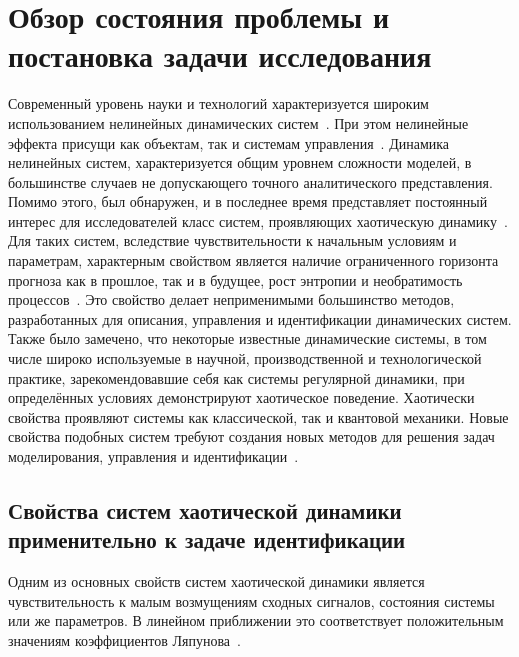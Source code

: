 \chapter{Обзор состояния проблемы и постановка задачи исследования}

Современный уровень науки и технологий характеризуется
широким использованием нелинейных динамических
систем~\cite{andronov_vitt_haikin,anisch_nonlin_eff,mishenko_du_small_relax,nonlin_vibro,malinetskii_modern_methods_nl_dyn}.
При этом нелинейные эффекта присущи как объектам,
так и системам управления~\cite{kubik_nlsc,vukobr_nonadopt}. Динамика нелинейных систем,
характеризуется общим уровнем сложности моделей,
в большинстве случаев не допускающего
точного аналитического представления.
Помимо этого, был обнаружен, и в последнее время представляет
постоянный интерес для исследователей класс систем,
проявляющих хаотическую динамику~\cite{moon_chaotic_vibr,magni_theory_dyn_chaos,kuznetsov_dyn_chaos,neimark_stoch_chaos_vibro,anisch_reg_and_chaotic_vibro}.
Для таких систем, вследствие чувствительности к начальным условиям
и параметрам, характерным свойством является наличие ограниченного горизонта прогноза как
в прошлое, так и в будущее, рост энтропии
и необратимость процессов~\cite{chernavskii_syn_info,prigogine_from_existent,koltsova_nl_dyn_chem}.
Это свойство делает неприменимыми
большинство методов, разработанных для описания, управления и
идентификации динамических систем. Также было замечено,
что некоторые известные динамические системы, в том числе широко
используемые в научной, производственной и технологической практике,
зарекомендовавшие себя как системы регулярной динамики,
при определённых условиях демонстрируют хаотическое поведение.
Хаотически свойства проявляют системы как классической,
так и квантовой механики.
Новые свойства подобных систем требуют создания новых
методов для решения задач моделирования,
управления и идентификации~\cite{karabutov_adapt_id_sys,dmitriev_trans_chaos_lowpower}.

\section{Свойства систем хаотической динамики применительно к задаче идентификации}  %

Одним из основных свойств систем хаотической динамики является чувствительность
к малым возмущениям сходных сигналов, состояния системы или же параметров.
В линейном приближении это соответствует положительным значениям
коэффициентов Ляпунова~\cite{magni_theory_dyn_chaos,moon_chaotic_vibr}.


